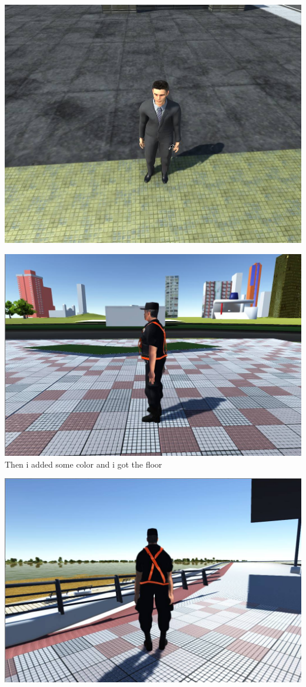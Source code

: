 \documentclass{article}
\begin{document}
  \includegraphics[width=\textwidth]{40.jpg}
  
  \includegraphics[width=\textwidth]{41.jpg}
  Then i added some color and i got the floor
  
  \includegraphics[width=\textwidth]{42.jpg}
  
\end{document}
